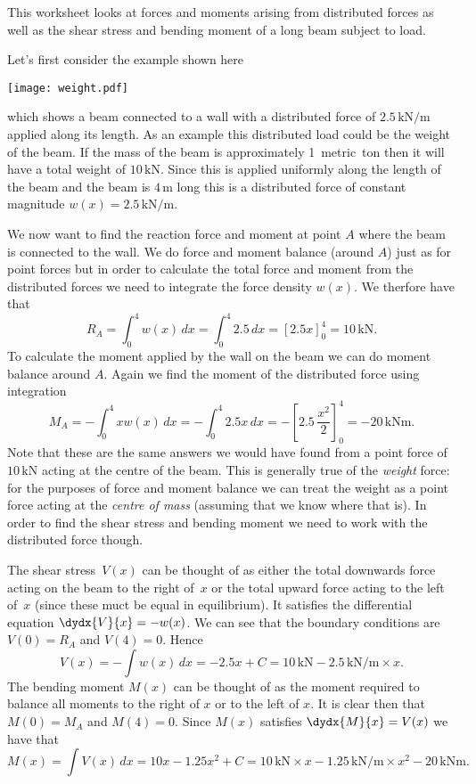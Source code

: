 This worksheet looks at forces and moments arising from distributed forces as
well as the shear stress and bending moment of a long beam subject to load.

Let's first consider the example shown here
\begin{center}
  \texttt{[image: weight.pdf]}
\end{center}
which shows a beam connected to a wall with a distributed force of
$2.5\,\mathrm{kN/m}$ applied along its length. As an example this distributed
load could be the weight of the beam. If the mass of the beam is
approximately 1~metric~ton then it will have a total weight of
$10\,\mathrm{kN}$. Since this is applied uniformly along the length of the
beam and the beam is $4\,\mathrm{m}$ long this is a distributed force of
constant magnitude $w(x) = 2.5\,\mathrm{kN/m}$.

We now want to find the reaction force and moment at point $A$ where the beam
is connected to the wall. We do force and moment balance (around $A$) just as
for point forces but in order to calculate the total force and moment from the
distributed forces we need to integrate the force density $w(x)$. We therfore
have that
\[
  R_A = \int_0^4 w(x)\,dx = \int_0^4 2.5\,dx = \left[2.5x\right]_0^4 =
  10\,\mathrm{kN}.
\]
To calculate the moment applied by the wall on the beam we can do moment
balance around $A$. Again we find the moment of the distributed force using
integration
\[
  M_A = -\int_0^4 x w(x)\,dx
      = -\int_0^4 2.5 x\,dx
      = -\left[2.5\,\frac{x^2}{2}\right]_0^4
      = -20\,\mathrm{kNm}.
\]
Note that these are the same answers we would have found from a point force of
$10\,\mathrm{kN}$ acting at the centre of the beam. This is generally true of
the \emph{weight} force: for the purposes of force and moment balance we can
treat the weight as a point force acting at the \emph{centre of mass}
(assuming that we know where that is). In order to find the shear stress and
bending moment we need to work with the distributed force though.

The shear stress~$V(x)$ can be thought of as either the total downwards force
acting on the beam to the right of~$x$ or the total upward force acting to the
left of~$x$ (since these muct be equal in equilibrium). It satisfies the
differential equation $\dydx{V}{x} = -w(x)$. We can see that the boundary
conditions are $V(0) = R_A$ and $V(4) = 0$. Hence
\[
  V(x)
    = -\int w(x)\,dx
    = -2.5x + C
    = 10\,\mathrm{kN} - 2.5\,\mathrm{kN/m}\times x.
\]
The bending moment $M(x)$ can be thought of as the moment required to balance
all moments to the right of $x$ or to the left of $x$. It is clear then that
$M(0) = M_A$ and $M(4)=0$. Since $M(x)$ satisfies $\dydx{M}{x} = V(x)$ we have
that
\[
  M(x)
    = \int V(x)\,dx
    = 10x - 1.25x^2 + C
    = 10\,\mathrm{kN}\times x - 1.25\,\mathrm{kN/m}\times x^2 -
    20\,\mathrm{kNm}.
\]
